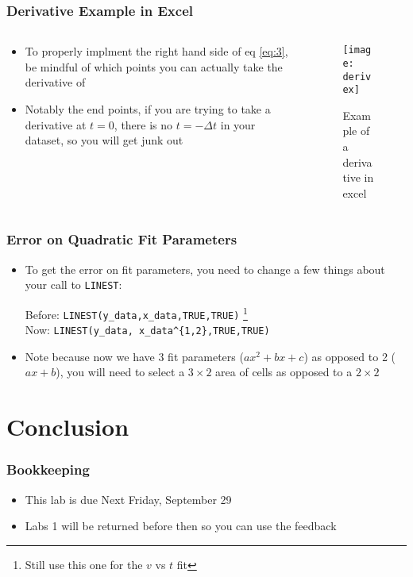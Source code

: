 \documentclass[aspectratio=169]{beamer}
\begin{document}
\begin{frame}
  \frametitle{Derivative Example in Excel}
  \begin{columns}
    \begin{column}{0.5\textwidth}
      \begin{itemize}
      \item To properly implment the right hand side of eq \eqref{eq:3}, be mindful of which points you can actually take the derivative of
      \item Notably the end points, if you are trying to take a derivative at $t=0$, there is no $t=-\Delta t$ in your dataset, so you will get junk out
      \end{itemize}
    \end{column}
    \begin{column}{0.5\textwidth}
      \begin{figure}[H]
        \centering
        \texttt{[image: derivex]}
        \caption{Example of a derivative in excel}
        \label{fig:2}
      \end{figure}
    \end{column}
  \end{columns}
\end{frame}

\begin{frame}
  \frametitle{Error on Quadratic Fit Parameters}
  \begin{itemize}
  \item To get the error on fit parameters, you need to change a few things about your call to \texttt{LINEST}:
    \begin{center}
      Before: \texttt{LINEST(y\_data,x\_data,TRUE,TRUE)}
      \footnote{Still use this one for the $v$ vs $t$ fit}\\
      Now: \texttt{LINEST(y\_data,{\color{red} x\_data\^{}\{1,2\}},TRUE,TRUE)}
    \end{center}
  \item Note because now we have 3 fit parameters ($ax^2+bx+c$) as opposed to 2 ($ax+b$), you will need to select a $3\times2$ area of cells as opposed to a $2\times2$
  \end{itemize}
\end{frame}

\section{Conclusion}
\begin{frame}
  \frametitle{Bookkeeping}
  \begin{itemize}
  \item This lab is due Next Friday, September 29
  \item Labs 1 will be returned before then so you can use the feedback
  \end{itemize}
\end{frame}
\end{document}
